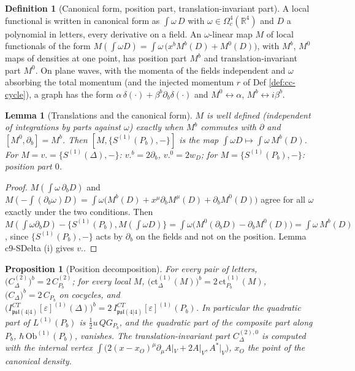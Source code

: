 \documentclass[11pt]{article}
\numberwithin{equation}{section}
\theoremstyle{plain}
\newtheorem{proposition}[theorem]{Proposition}
\newtheorem{lemma}[theorem]{Lemma}
\theoremstyle{definition}
\newtheorem{definition}[theorem]{Definition}
\newcommand{\AV}{A|_V}
\begin{document}
\begin{definition}[Canonical form, position part, translation-invariant part]
\label{def:cc-canonical}
A local functional is written in canonical form as $\int\omega\,D$ with $\omega\in\Omega^4_c(\mathbb R^4)$ and $D$ a polynomial in letters, every derivative on a field. An $\omega$-linear map $M$ of local functionals of the form $M(\int\omega D)=\int\omega\,\big(x^bM^b(D)+M^0(D)\big)$, with $M^b$, $M^0$ maps of densities at one point, has position part $M^b$ and translation-invariant part $M^0$. On plane waves, with the momenta of the fields independent and $\omega$ absorbing the total momentum (and the injected momentum $r$ of Def \ref{def:cc-cycle}), a graph has the form $\alpha\,\delta(\cdot)+\beta^b\partial_b\delta(\cdot)$ and $M^0\leftrightarrow\alpha$, $M^b\leftrightarrow i\beta^b$.
\end{definition}

\begin{lemma}[Translations and the canonical form]
\label{lem:cc-canonical}
$M$ is well defined (independent of integrations by parts against $\omega$) exactly when $M^b$ commutes with $\partial$ and $[M^0,\partial_b]=M^b$. Then $[M,\{S^{(1)}(P_b),-\}]$ is the map $\int\omega D\mapsto\int\omega\,M^b(D)$. For $M=v.=\{S^{(1)}(\Delta),-\}$: $v.^b=2\partial_b$, $v.^0=2w_D$; for $M=\{S^{(1)}(P_b),-\}$: position part $0$.
\end{lemma}

\begin{proof}
$M(\int\omega\,\partial_bD)$ and $M(-\int(\partial_b\omega)D)=\int\omega\big(M^b(D)+x^\mu\partial_bM^\mu(D)+\partial_bM^0(D)\big)$ agree for all $\omega$ exactly under the two conditions. Then $M(\int\omega\partial_bD)-\{S^{(1)}(P_b),M(\int\omega D)\}=\int\omega\big(M^0(\partial_bD)-\partial_bM^0(D)\big)=\int\omega\,M^b(D)$, since $\{S^{(1)}(P_b),-\}$ acts by $\partial_b$ on the fields and not on the position. Lemma c9-SDelta (i) gives $v.$.
\end{proof}

\begin{proposition}[Position decomposition]
\label{prop:cc-position}
For every pair of letters, $\big(C^{(2)}_\Delta\big)^b=2\,C^{(2)}_{P_b}$; for every local $M$, $\big(\mathrm{ct}^{(1)}_\Delta(M)\big)^b=2\,\mathrm{ct}^{(1)}_{P_b}(M)$, $\big(C_\Delta\big)^b=2\,C_{P_b}$ on cocycles, and $\big(I^{CT}_{\mathfrak{psl}(4|4)}[\varepsilon]^{(1)}(\Delta)\big)^b=2\,I^{CT}_{\mathfrak{psl}(4|4)}[\varepsilon]^{(1)}(P_b)$. In particular the quadratic part of $L^{(1)}(P_b)$ is $\tfrac12u\,QG_{P_b}$, and the quadratic part of the composite part along $P_b$, $\hbar\,\mathrm{Ob}^{(1)}(P_b)$, vanishes. The translation-invariant part $C^{(2),0}_\Delta$ is computed with the internal vertex $\int\big(2(x-x_O)^\mu\partial_\mu\AV+2\AV,A^*|_V\big)$, $x_O$ the point of the canonical density.
\end{proposition}
\end{document}
